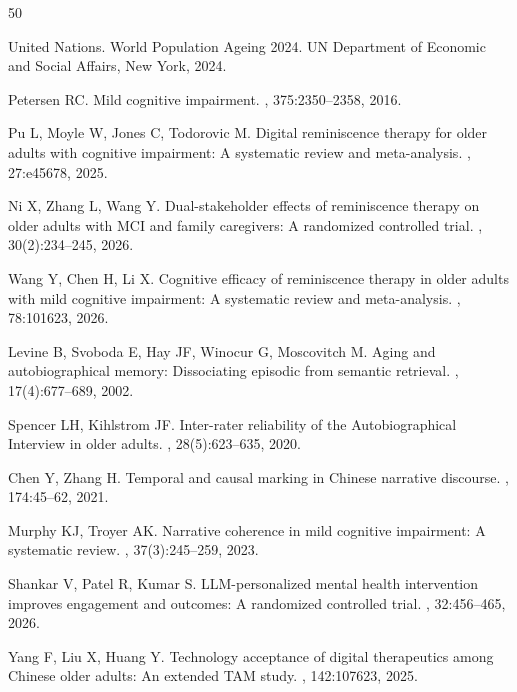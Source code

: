 \documentclass{article}
\begin{document}

\begin{thebibliography}{50}

United Nations.
\newblock World Population Ageing 2024.
\newblock UN Department of Economic and Social Affairs, New York, 2024.

Petersen RC.
\newblock Mild cognitive impairment.
, 375:2350--2358, 2016.

Pu L, Moyle W, Jones C, Todorovic M.
\newblock Digital reminiscence therapy for older adults with cognitive impairment: A systematic review and meta-analysis.
, 27:e45678, 2025.

Ni X, Zhang L, Wang Y.
\newblock Dual-stakeholder effects of reminiscence therapy on older adults with MCI and family caregivers: A randomized controlled trial.
, 30(2):234--245, 2026.

Wang Y, Chen H, Li X.
\newblock Cognitive efficacy of reminiscence therapy in older adults with mild cognitive impairment: A systematic review and meta-analysis.
, 78:101623, 2026.

Levine B, Svoboda E, Hay JF, Winocur G, Moscovitch M.
\newblock Aging and autobiographical memory: Dissociating episodic from semantic retrieval.
, 17(4):677--689, 2002.

Spencer LH, Kihlstrom JF.
\newblock Inter-rater reliability of the Autobiographical Interview in older adults.
, 28(5):623--635, 2020.

Chen Y, Zhang H.
\newblock Temporal and causal marking in Chinese narrative discourse.
, 174:45--62, 2021.

Murphy KJ, Troyer AK.
\newblock Narrative coherence in mild cognitive impairment: A systematic review.
, 37(3):245--259, 2023.

Shankar V, Patel R, Kumar S.
\newblock LLM-personalized mental health intervention improves engagement and outcomes: A randomized controlled trial.
, 32:456--465, 2026.

Yang F, Liu X, Huang Y.
\newblock Technology acceptance of digital therapeutics among Chinese older adults: An extended TAM study.
, 142:107623, 2025.


\end{thebibliography}
\end{document}
